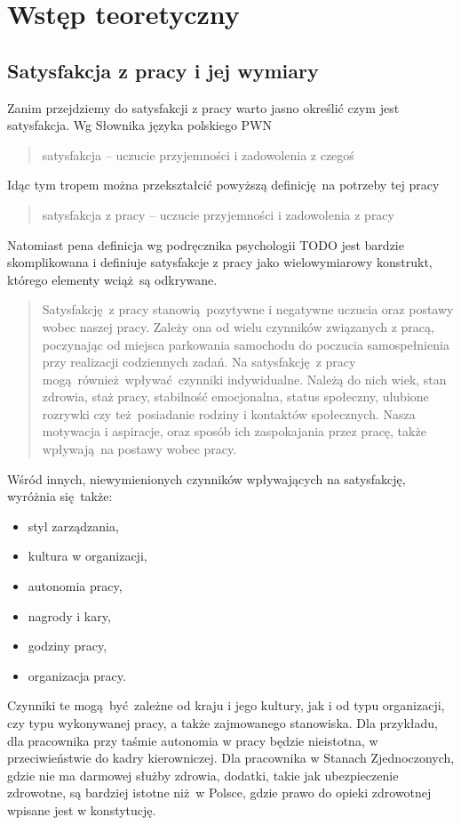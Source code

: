 \section{Wstęp teoretyczny}
\subsection{Satysfakcja z pracy i jej wymiary}
Zanim przejdziemy do satysfakcji z pracy warto jasno określić czym jest satysfakcja. Wg Słownika języka polskiego PWN
\begin{quote}
satysfakcja -- uczucie przyjemności i zadowolenia z czegoś
\end{quote}
Idąc tym tropem można przekształcić powyższą definicję na potrzeby tej pracy
\begin{quote}
satysfakcja z pracy -- uczucie przyjemności i zadowolenia z pracy
\end{quote}

Natomiast pena definicja wg podręcznika psychologii TODO jest bardzie skomplikowana i definiuje satysfakcje z pracy jako wielowymiarowy konstrukt, którego elementy wciąż są odkrywane.

\begin{quotation}
Satysfakcję z pracy stanowią pozytywne i negatywne uczucia oraz postawy wobec naszej pracy. Zależy ona od wielu czynników związanych z pracą, poczynając od miejsca parkowania samochodu do poczucia samospełnienia przy realizacji codziennych zadań. Na satysfakcję z pracy mogą również wpływać czynniki indywidualne. Należą do nich wiek, stan zdrowia, staż pracy, stabilność emocjonalna, status społeczny, ulubione rozrywki czy też posiadanie rodziny i kontaktów społecznych. Nasza motywacja i
aspiracje, oraz sposób ich zaspokajania przez pracę, także wpływają na postawy wobec pracy.
\end{quotation}
Wśród innych, niewymienionych czynników wpływających na satysfakcję, wyróżnia się także:
\begin{itemize}
\item styl zarządzania,
\item kultura w organizacji,
\item autonomia pracy,
\item nagrody i kary,
\item godziny pracy,
\item organizacja pracy.
\end{itemize}
Czynniki te mogą być zależne od kraju i jego kultury, jak i od typu organizacji, czy typu wykonywanej pracy, a także zajmowanego stanowiska. Dla przykładu, dla pracownika przy taśmie autonomia w pracy będzie nieistotna, w przeciwieństwie do kadry kierowniczej. Dla pracownika w Stanach Zjednoczonych, gdzie nie ma darmowej służby zdrowia, dodatki, takie jak ubezpieczenie zdrowotne, są bardziej istotne niż w Polsce, gdzie prawo do opieki zdrowotnej wpisane jest w konstytucję. 

